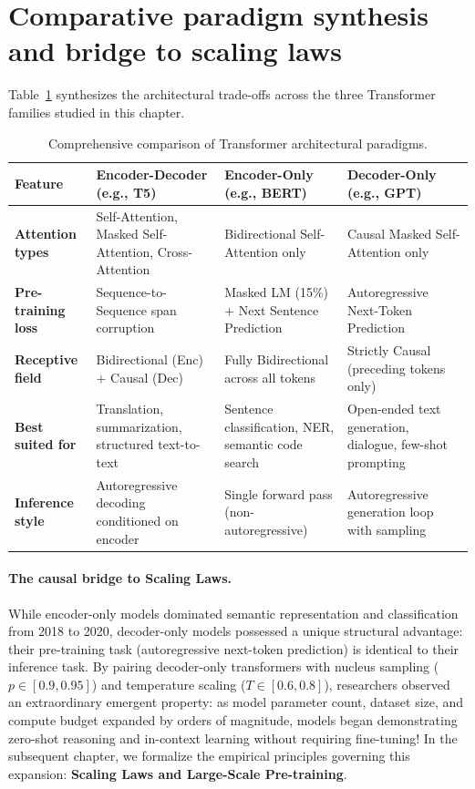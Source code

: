 \documentclass[../../main.tex]{subfiles}
\begin{document}
\section{Comparative paradigm synthesis and bridge to scaling laws}
\label{sec:comparative_synthesis_scaling_bridge}

Table~\ref{tab:transformer_paradigm_comparison} synthesizes the architectural trade-offs across the three Transformer families studied in this chapter.

\begin{table}[htbp]
\centering
\small
\caption{Comprehensive comparison of Transformer architectural paradigms.}
\label{tab:transformer_paradigm_comparison}
\begin{tabularx}{\textwidth}{lXXX}
\toprule
\textbf{Feature} & \textbf{Encoder-Decoder (e.g., T5)} & \textbf{Encoder-Only (e.g., BERT)} & \textbf{Decoder-Only (e.g., GPT)} \\
\midrule
\textbf{Attention types} & Self-Attention, Masked Self-Attention, Cross-Attention & Bidirectional Self-Attention only & Causal Masked Self-Attention only \\
\textbf{Pre-training loss} & Sequence-to-Sequence span corruption & Masked LM (15\%) $+$ Next Sentence Prediction & Autoregressive Next-Token Prediction \\
\textbf{Receptive field} & Bidirectional (Enc) $+$ Causal (Dec) & Fully Bidirectional across all tokens & Strictly Causal (preceding tokens only) \\
\textbf{Best suited for} & Translation, summarization, structured text-to-text & Sentence classification, NER, semantic code search & Open-ended text generation, dialogue, few-shot prompting \\
\textbf{Inference style} & Autoregressive decoding conditioned on encoder & Single forward pass (non-autoregressive) & Autoregressive generation loop with sampling \\
\bottomrule
\end{tabularx}
\end{table}

\paragraph{The causal bridge to Scaling Laws.}
While encoder-only models dominated semantic representation and classification from 2018 to 2020, decoder-only models possessed a unique structural advantage: their pre-training task (autoregressive next-token prediction) is identical to their inference task.
By pairing decoder-only transformers with nucleus sampling ($p \in [0.9, 0.95]$) and temperature scaling ($T \in [0.6, 0.8]$), researchers observed an extraordinary emergent property: as model parameter count, dataset size, and compute budget expanded by orders of magnitude, models began demonstrating zero-shot reasoning and in-context learning without requiring fine-tuning!
In the subsequent chapter, we formalize the empirical principles governing this expansion: \textbf{Scaling Laws and Large-Scale Pre-training}.
\end{document}
